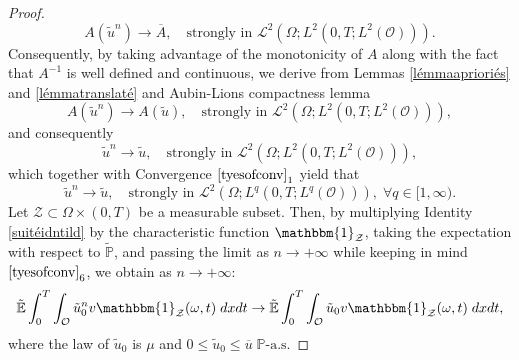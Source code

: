 \documentclass[10pt,number,preprint,times]{elsarticle}
\numberwithin{equation}{section} %
\begin{document}
\begin{proof}
$$
A(\tilde{u}^n) \rightarrow \overline{A}, \quad \text{strongly in }  \mathcal{L}^2(\Omega;L^2(0,T;L^2(\mathcal{O}))).
$$
{\color{black}Consequently, by taking advantage of the monotonicity of $A$ along with the fact that $A^{-1}$ is well defined and continuous, we derive from Lemmas \ref{lémmaaprioriés} and \ref{lémmatranslaté} and Aubin-Lions compactness lemma \cite{simon1986compact}}
$$
A(\tilde{u}^n) \rightarrow {A}(\tilde{u}), \quad \text{strongly in }  \mathcal{L}^2(\Omega;L^2(0,T;L^2(\mathcal{O}))),
$$
and consequently
$$
\tilde{u}^n \rightarrow \tilde{u}, \quad \text{strongly in }  \mathcal{L}^2(\Omega;L^2(0,T;L^2(\mathcal{O}))),
$$
which together with Convergence $\eqref{tyesofconv}_1$ yield that 
\begin{equation}\label{convlq}
\tilde{u}^n \rightarrow \tilde{u}, \quad \text{strongly in }  \mathcal{L}^2(\Omega;L^q(0,T;L^q(\mathcal{O}))), \; \forall q \in [1,\infty).
\end{equation}
Let $\mathcal{Z} \subset \Omega \times (0,T)$ be a measurable subset. Then, by multiplying  Identity \eqref{suitéidntild} by the characteristic function $\mathbbm{1}_{\mathcal{Z}}$, taking the expectation with respect to $\mathbb{\tilde{P}}$, and passing the limit as $n \rightarrow +\infty$ while keeping in mind $\eqref{tyesofconv}_6$, we obtain as $n \rightarrow +\infty$:
$$
\tilde{\mathbb{E}} \int_0^T \int_\mathcal{O} \tilde{u}_0^n v \mathbbm{1}_{\mathcal{Z}}(\omega,t)\; dxdt \rightarrow  \tilde{\mathbb{E}}\int_0^T \int_\mathcal{O} \tilde{u}_0 v \mathbbm{1}_{\mathcal{Z}}(\omega,t)\; dxdt, 
$$
where the law of $\tilde{u}_0$ is $\mu$ and $0 \leq \tilde{u}_0 \leq \overline{u}\; \mathbb{P}\text{-a.s}$.


\end{proof}
\end{document}
